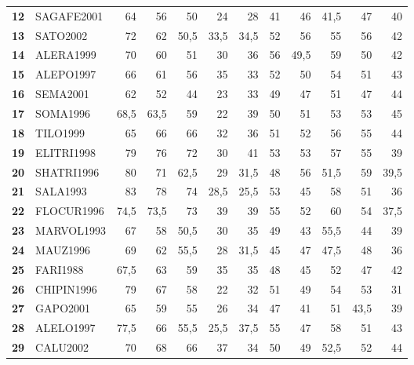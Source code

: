 \begin{landscape}
\begin{table}[p]
\begin{tabular}{>{\bfseries}cl*{10}{D{,}{,}{2.1}}}
12 & SAGAFE2001 & 64 & 56 & 50 & 24 & 28 & 41 & 46 & 41,5 & 47 & 40 \\
13 & SATO2002 & 72 & 62 & 50,5 & 33,5 & 34,5 & 52 & 56 & 55 & 56 & 42 \\
14 & ALERA1999 & 70 & 60 & 51 & 30 & 36 & 56 & 49,5 & 59 & 50 & 42 \\
15 & ALEPO1997 & 66 & 61 & 56 & 35 & 33 & 52 & 50 & 54 & 51 & 43 \\
16 & SEMA2001 & 62 & 52 & 44 & 23 & 33 & 49 & 47 & 51 & 47 & 44 \\
17 & SOMA1996 & 68,5 & 63,5 & 59 & 22 & 39 & 50 & 51 & 53 & 53 & 45 \\
18 & TILO1999 & 65 & 66 & 66 & 32 & 36 & 51 & 52 & 56 & 55 & 44 \\
19 & ELITRI1998 & 79 & 76 & 72 & 30 & 41 & 53 & 53 & 57 & 55 & 39 \\
20 & SHATRI1996 & 80 & 71 & 62,5 & 29 & 31,5 & 48 & 56 & 51,5 & 59 & 39,5 \\
21 & SALA1993 & 83 & 78 & 74 & 28,5 & 25,5 & 53 & 45 & 58 & 51 & 36 \\
22 & FLOCUR1996 & 74,5 & 73,5 & 73 & 39 & 39 & 55 & 52 & 60 & 54 & 37,5 \\
23 & MARVOL1993 & 67 & 58 & 50,5 & 30 & 35 & 49 & 43 & 55,5 & 44 & 39 \\
24 & MAUZ1996 & 69 & 62 & 55,5 & 28 & 31,5 & 45 & 47 & 47,5 & 48 & 36 \\
25 & FARI1988 & 67,5 & 63 & 59 & 35 & 35 & 48 & 45 & 52 & 47 & 42 \\
26 & CHIPIN1996 & 79 & 67 & 58 & 22 & 32 & 51 & 49 & 54 & 53 & 31 \\
27 & GAPO2001 & 65 & 59 & 55 & 26 & 34 & 47 & 41 & 51 & 43,5 & 39 \\
28 & ALELO1997 & 77,5 & 66 & 55,5 & 25,5 & 37,5 & 55 & 47 & 58 & 51 & 43 \\
29 & CALU2002 & 70 & 68 & 66 & 37 & 34 & 50 & 49 & 52,5 & 52 & 44 \\
\bottomrule
\end{tabular}
\end{table}


\end{landscape}
